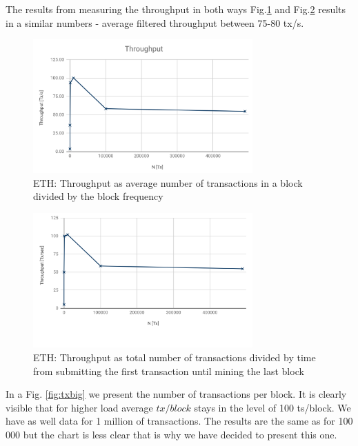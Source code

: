  
 
The results from measuring the throughput in both ways Fig.\ref{fig:throughput1} and Fig.\ref{fig:throughput2} results in a similar numbers - average filtered throughput between 75-80 tx/s.
 
\begin{figure}[!h]
    \centering
    \includegraphics[width=0.75\textwidth]{img/Throughput_ETH.png}
   \caption{ETH: Throughput as average number of transactions in a block divided by the block frequency}
   \label{fig:throughput1}
\end{figure}
 
\begin{figure}[!h]
    \centering
    \includegraphics[width=0.75\textwidth]{img/Throughputalt.png}
   \caption{ETH: Throughput as total number of transactions divided by time from submitting the first transaction until mining the last block}
   \label{fig:throughput2}
\end{figure}
 
In a Fig. \ref{fig:txbig} we present the number of transactions per block. It is clearly visible that for  higher load average $tx/block$ stays in the level of 100 ts/block. We have as well data for 1 million of transactions. The results are the same as for 100 000 but the chart is less clear that is why we have decided to present this one.
 
